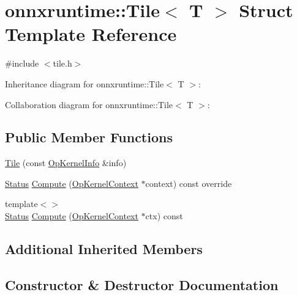 \hypertarget{structonnxruntime_1_1Tile}{}\section{onnxruntime\+:\+:Tile$<$ T $>$ Struct Template Reference}
\label{structonnxruntime_1_1Tile}


{\ttfamily \#include $<$tile.\+h$>$}



Inheritance diagram for onnxruntime\+:\+:Tile$<$ T $>$\+:


Collaboration diagram for onnxruntime\+:\+:Tile$<$ T $>$\+:
\subsection*{Public Member Functions}
\begin{DoxyCompactItemize}
\item 
\mbox{\hyperlink{structonnxruntime_1_1Tile_a9c9f7fb900e79f46343f6ea5140d9e98}{Tile}} (const \mbox{\hyperlink{classonnxruntime_1_1OpKernelInfo}{Op\+Kernel\+Info}} \&info)
\item 
\mbox{\hyperlink{classonnxruntime_1_1common_1_1Status}{Status}} \mbox{\hyperlink{structonnxruntime_1_1Tile_a85996660410b4f15b9fe2a2f5c639d82}{Compute}} (\mbox{\hyperlink{classonnxruntime_1_1OpKernelContext}{Op\+Kernel\+Context}} $\ast$context) const override
\item 
{\footnotesize template$<$$>$ }\\\mbox{\hyperlink{classonnxruntime_1_1common_1_1Status}{Status}} \mbox{\hyperlink{structonnxruntime_1_1Tile_aca70e841d7cf4fe244a5900d5395f840}{Compute}} (\mbox{\hyperlink{classonnxruntime_1_1OpKernelContext}{Op\+Kernel\+Context}} $\ast$ctx) const
\end{DoxyCompactItemize}
\subsection*{Additional Inherited Members}


\subsection{Constructor \& Destructor Documentation}
\mbox{\label{structonnxruntime_1_1Tile_a9c9f7fb900e79f46343f6ea5140d9e98}} 
